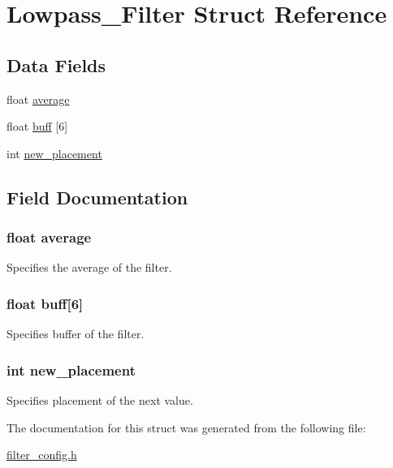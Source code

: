 \hypertarget{struct_lowpass___filter}{\section{Lowpass\-\_\-\-Filter Struct Reference}
\label{struct_lowpass___filter}
}
\subsection*{Data Fields}
\begin{DoxyCompactItemize}
\item 
float \hyperlink{struct_lowpass___filter_a28950bb39985d4589b8c34831cc1a4e7}{average}
\item 
float \hyperlink{struct_lowpass___filter_aa6f7c2c46ae168fd7dc603fa0ff93474}{buff} \mbox{[}6\mbox{]}
\item 
int \hyperlink{struct_lowpass___filter_a1349a0da10e343b95f56e3f2c15a7644}{new\-\_\-placement}
\end{DoxyCompactItemize}


\subsection{Field Documentation}
\hypertarget{struct_lowpass___filter_a28950bb39985d4589b8c34831cc1a4e7}{
\subsubsection[{average}]{\setlength{\rightskip}{0pt plus 5cm}float average}}\label{struct_lowpass___filter_a28950bb39985d4589b8c34831cc1a4e7}
Specifies the average of the filter. \hypertarget{struct_lowpass___filter_aa6f7c2c46ae168fd7dc603fa0ff93474}{
\subsubsection[{buff}]{\setlength{\rightskip}{0pt plus 5cm}float buff\mbox{[}6\mbox{]}}}\label{struct_lowpass___filter_aa6f7c2c46ae168fd7dc603fa0ff93474}
Specifies buffer of the filter. \hypertarget{struct_lowpass___filter_a1349a0da10e343b95f56e3f2c15a7644}{
\subsubsection[{new\-\_\-placement}]{\setlength{\rightskip}{0pt plus 5cm}int new\-\_\-placement}}\label{struct_lowpass___filter_a1349a0da10e343b95f56e3f2c15a7644}
Specifies placement of the next value. 

The documentation for this struct was generated from the following file\-:\begin{DoxyCompactItemize}
\item 
\hyperlink{filter__config_8h}{filter\-\_\-config.\-h}\end{DoxyCompactItemize}

